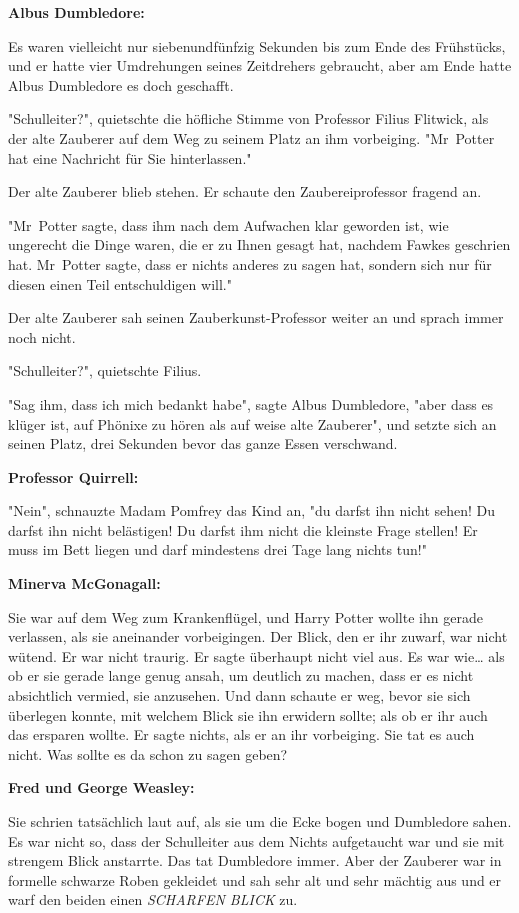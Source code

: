 {\textbf{Albus Dumbledore:}

Es waren vielleicht nur siebenundfünfzig Sekunden bis zum Ende des Frühstücks, und er hatte vier Umdrehungen seines Zeitdrehers gebraucht, aber am Ende hatte Albus Dumbledore es doch geschafft.

"Schulleiter?", quietschte die höfliche Stimme von Professor Filius Flitwick, als der alte Zauberer auf dem Weg zu seinem Platz an ihm vorbeiging. "Mr~Potter hat eine Nachricht für Sie hinterlassen."

Der alte Zauberer blieb stehen. Er schaute den Zaubereiprofessor fragend an.

"Mr~Potter sagte, dass ihm nach dem Aufwachen klar geworden ist, wie ungerecht die Dinge waren, die er zu Ihnen gesagt hat, nachdem Fawkes geschrien hat. Mr~Potter sagte, dass er nichts anderes zu sagen hat, sondern sich nur für diesen einen Teil entschuldigen will."

Der alte Zauberer sah seinen Zauberkunst-Professor weiter an und sprach immer noch nicht.

"Schulleiter?", quietschte Filius.

"Sag ihm, dass ich mich bedankt habe", sagte Albus Dumbledore, "aber dass es klüger ist, auf Phönixe zu hören als auf weise alte Zauberer", und setzte sich an seinen Platz, drei Sekunden bevor das ganze Essen verschwand.

\textbf{Professor Quirrell:}

"Nein", schnauzte Madam Pomfrey das Kind an, "du darfst ihn nicht sehen! Du darfst ihn nicht belästigen! Du darfst ihm nicht die kleinste Frage stellen! Er muss im Bett liegen und darf mindestens drei Tage lang nichts tun!"

\textbf{Minerva McGonagall:}

Sie war auf dem Weg zum Krankenflügel, und Harry Potter wollte ihn gerade verlassen, als sie aneinander vorbeigingen. Der Blick, den er ihr zuwarf, war nicht wütend. Er war nicht traurig. Er sagte überhaupt nicht viel aus. Es war wie… als ob er sie gerade lange genug ansah, um deutlich zu machen, dass er es nicht absichtlich vermied, sie anzusehen. Und dann schaute er weg, bevor sie sich überlegen konnte, mit welchem Blick sie ihn erwidern sollte; als ob er ihr auch das ersparen wollte. Er sagte nichts, als er an ihr vorbeiging. Sie tat es auch nicht. Was sollte es da schon zu sagen geben?

\textbf{Fred und George Weasley:}

Sie schrien tatsächlich laut auf, als sie um die Ecke bogen und Dumbledore sahen. Es war nicht so, dass der Schulleiter aus dem Nichts aufgetaucht war und sie mit strengem Blick anstarrte. Das tat Dumbledore immer. Aber der Zauberer war in formelle schwarze Roben gekleidet und sah sehr alt und sehr mächtig aus und er warf den beiden einen \emph{SCHARFEN BLICK} zu.

}

